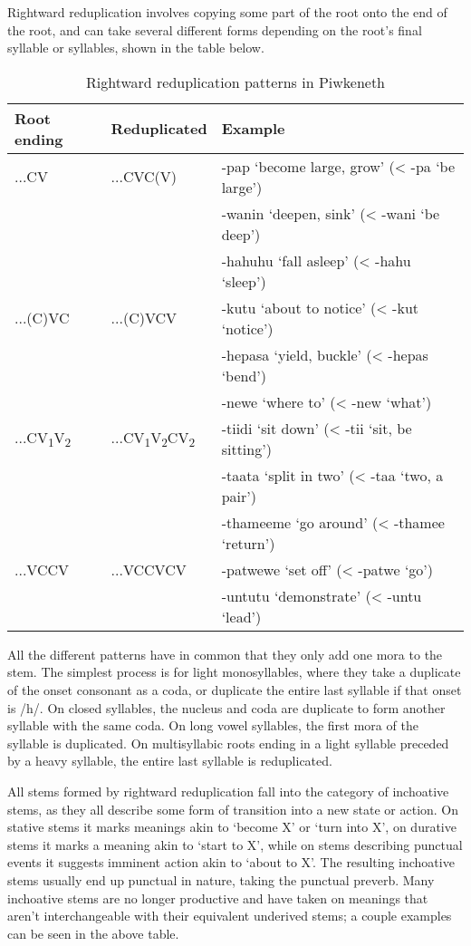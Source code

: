 \documentclass[smallroyalvopaper,9pt]{memoir}
\newcommand{\lang}{Piwkeneth}
\newcommand{\tsub}[1]{\textsubscript{#1}}
\begin{document}
Rightward reduplication involves copying some part of the root onto the end of the root, and can take several different forms depending on the root's final syllable or syllables, shown in the table below.

\begin{table}[ht]
    \centering
    \begin{tabular}{lll}
        \toprule
        Root ending & Reduplicated & Example \\
        \midrule
        ...CV & ...CVC(V)& -pap `become large, grow' (< -pa `be large') \\
              &         & -wanin `deepen, sink' (< -wani `be deep') \\
              &         & -hahuhu `fall asleep' (< -hahu `sleep') \\
        ...(C)VC & ...(C)VCV  & -kutu `about to notice' (< -kut `notice') \\
              &         & -hepasa `yield, buckle' (< -hepas `bend') \\
              &         & -newe `where to' (< -new `what') \\
        ...CV\tsub{1}V\tsub{2} & ...CV\tsub{1}V\tsub{2}CV\tsub{2} & -tiidi `sit down' (< -tii `sit, be sitting') \\
              &         & -taata `split in two' (< -taa `two, a pair') \\
              &         & -thameeme `go around' (< -thamee `return') \\
        ...VCCV & ...VCCVCV & -patwewe `set off' (< -patwe `go') \\
              &         & -untutu `demonstrate' (< -untu `lead') \\
        \bottomrule
    \end{tabular}
    \caption{Rightward reduplication patterns in \lang}
\end{table}

All the different patterns have in common that they only add one mora to the stem. The simplest process is for light monosyllables, where they take a duplicate of the onset consonant as a coda, or duplicate the entire last syllable if that onset is /h/. On closed syllables, the nucleus and coda are duplicate to form another syllable with the same coda. On long vowel syllables, the first mora of the syllable is duplicated. On multisyllabic roots ending in a light syllable preceded by a heavy syllable, the entire last syllable is reduplicated.

All stems formed by rightward reduplication fall into the category of inchoative stems, as they all describe some form of transition into a new state or action. On stative stems it marks meanings akin to `become X' or `turn into X', on durative stems it marks a meaning akin to `start to X', while on stems describing punctual events it suggests imminent action akin to `about to X'. The resulting inchoative stems usually end up punctual in nature, taking the punctual preverb. Many inchoative stems are no longer productive and have taken on meanings that aren't interchangeable with their equivalent underived stems; a couple examples can be seen in the above table.
\end{document}
